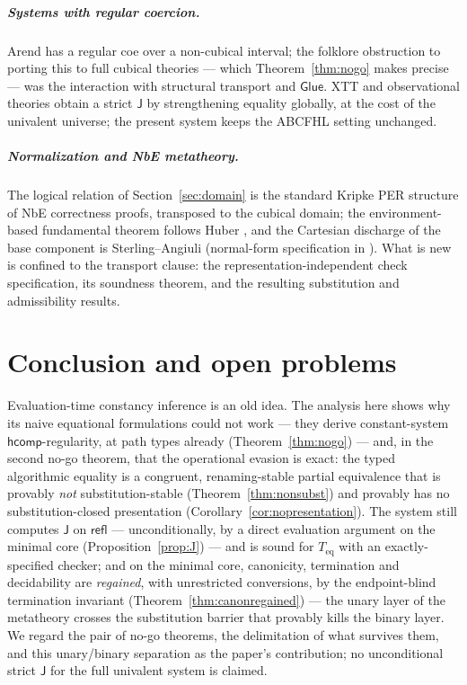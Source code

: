 \documentclass{lmcs}
\newcommand{\hcomp}{\mathsf{hcomp}}
\newcommand{\refl}{\mathsf{refl}}
\newcommand{\J}{\mathsf{J}}
\newcommand{\Glue}{\mathsf{Glue}}
\begin{document}
\subparagraph*{Systems with regular coercion.}  Arend \cite{Arend}
has a regular \textsf{coe} over a non-cubical interval; the folklore
obstruction to porting this to full cubical theories --- which
Theorem~\ref{thm:nogo} makes precise --- was the interaction with
structural transport and $\Glue$.  XTT and observational theories
\cite{StickyXTT} obtain a strict $\J$ by strengthening equality
globally, at the cost of the univalent universe; the present system
keeps the ABCFHL setting unchanged.

\subparagraph*{Normalization and NbE metatheory.}  The logical
relation of Section~\ref{sec:domain} is the standard Kripke PER
structure of NbE correctness proofs, transposed to the cubical
domain; the environment-based fundamental theorem follows Huber
\cite{HuberNorm}, and the Cartesian discharge of the base component
is Sterling--Angiuli \cite{SterlingAngiuli} (normal-form
specification in \cite{HuangNF}).  What is new is confined to the
transport clause: the representation-independent check specification,
its soundness theorem, and the resulting substitution and
admissibility results.

\section{Conclusion and open problems}
\label{sec:conclusion}

Evaluation-time constancy inference is an old idea.  The analysis
here shows why its naive equational formulations could not work ---
they derive constant-system $\hcomp$-regularity, at path types
already (Theorem~\ref{thm:nogo}) --- and, in the second no-go
theorem, that the operational evasion is exact: the typed
algorithmic equality is a congruent, renaming-stable partial
equivalence that is provably \emph{not} substitution-stable
(Theorem~\ref{thm:nonsubst}) and provably has no
substitution-closed presentation
(Corollary~\ref{cor:nopresentation}).  The system still computes
$\J$ on $\refl$ --- unconditionally, by a direct evaluation
argument on the minimal core (Proposition~\ref{prop:J}) --- and is
sound for $T_{\mathrm{eq}}$ with an exactly-specified checker; and
on the minimal core, canonicity, termination and decidability are
\emph{regained}, with unrestricted conversions, by the
endpoint-blind termination invariant
(Theorem~\ref{thm:canonregained}) --- the unary layer of the
metatheory crosses the substitution barrier that provably kills the
binary layer.  We regard the pair of no-go theorems, the
delimitation of what survives them, and this unary/binary
separation as the paper's contribution; no unconditional strict
$\J$ for the full univalent system is claimed.
\end{document}
